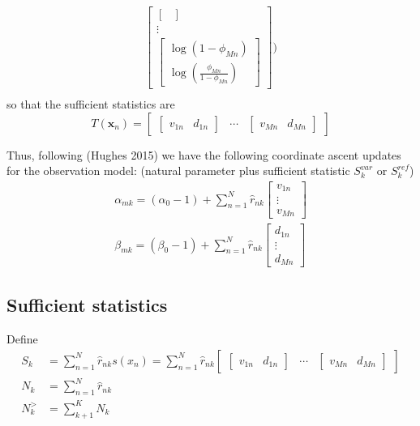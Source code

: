 \documentclass[11pt]{article}
\newcommand{\bx}{\ensuremath{\mathbf{x}}}
\begin{document}
\begin{appendices}
\begin{align}
\begin{bmatrix}
\begin{bmatrix}
				\end{bmatrix} \\
				\vdots \\
				\begin{bmatrix}
					\log\left(1 - \phi_{Mn}\right) \\ \log\left(\frac{\phi_{Mn}}{1 - \phi_{Mn}}\right)
				\end{bmatrix}
			\end{bmatrix} \bigg)\\
\end{align}
so that the sufficient statistics are
\begin{equation}
T(\bx_n) = 
\begin{bmatrix}
				\begin{bmatrix}
				 v_{1n} &  d_{1n}
				\end{bmatrix} & \cdots &
				\begin{bmatrix}
				 v_{Mn} &  d_{Mn}
				\end{bmatrix}
			\end{bmatrix}
\end{equation}

Thus, following (Hughes 2015) we have the following coordinate ascent updates for the observation model: (natural parameter plus sufficient statistic $S_k^{var}$ or $S_k^{ref}$)
\begin{align*}
\alpha_{mk} =  (\alpha_0 - 1) + \sum_{n=1}^N \hat{r}_{nk} \begin{bmatrix} v_{1n} \\ \vdots \\ v_{Mn} \end{bmatrix} \\
\beta_{mk} = (\beta_0 - 1) + \sum_{n=1}^N \hat{r}_{nk} \begin{bmatrix} d_{1n} \\ \vdots \\ d_{Mn} \end{bmatrix}
\end{align*}

\subsection{Sufficient statistics}
Define 
\begin{align}
S_k &= \sum_{n=1}^N \hat{r}_{nk} s(x_n) = \sum_{n=1}^N \hat{r}_{nk} \begin{bmatrix}
				\begin{bmatrix}
				 v_{1n} &  d_{1n}
				\end{bmatrix} & \cdots &
				\begin{bmatrix}
				 v_{Mn} &  d_{Mn}
				\end{bmatrix}
			\end{bmatrix} \\
N_k &= \sum_{n=1}^N \hat{r}_{nk} \\
N_k^> &= \sum_{k+1}^K N_k
\end{align}


\end{appendices}
\end{document}

